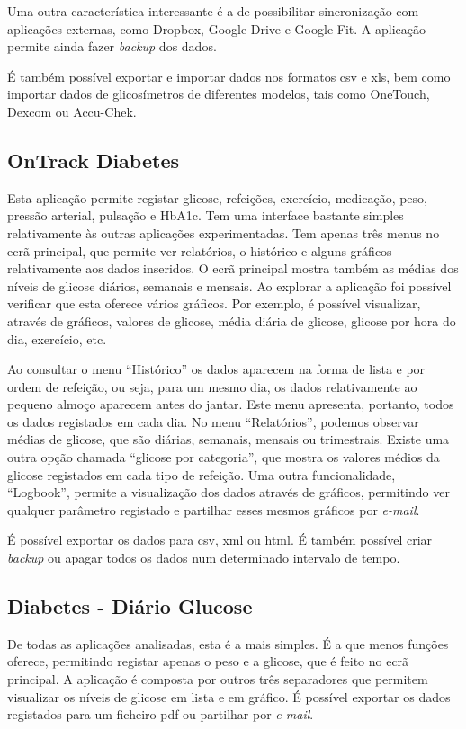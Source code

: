 Uma outra característica interessante é a de possibilitar sincronização com aplicações externas, como Dropbox, Google Drive e Google Fit. A aplicação permite ainda fazer \textit{backup} dos dados.

É também possível exportar e importar dados nos formatos csv e xls, bem como importar dados de glicosímetros de diferentes modelos, tais como OneTouch, Dexcom ou Accu-Chek.

\subsection{OnTrack Diabetes}

Esta aplicação permite registar glicose, refeições, exercício, medicação, peso, pressão arterial, pulsação e HbA1c. Tem uma interface bastante simples relativamente às outras aplicações experimentadas. Tem apenas três menus no ecrã principal, que permite ver relatórios, o histórico e alguns gráficos relativamente aos dados inseridos. O ecrã principal mostra também as médias dos níveis de glicose diários, semanais e mensais. Ao explorar a aplicação foi possível verificar que esta oferece vários gráficos. Por exemplo, é possível visualizar, através de gráficos, valores de glicose, média diária de glicose, glicose por hora do dia, exercício, etc.

Ao consultar o menu ``Histórico'' os dados aparecem na forma de lista e por ordem de refeição, ou seja, para um mesmo dia, os dados relativamente ao pequeno almoço aparecem antes do jantar. Este menu apresenta, portanto, todos os dados registados em cada dia. 
No menu ``Relatórios'', podemos observar médias de glicose, que são diárias, semanais, mensais ou trimestrais. Existe uma outra opção chamada ``glicose por categoria'', que mostra os valores médios da glicose registados em cada tipo de refeição.
Uma outra funcionalidade, ``Logbook'', permite a visualização dos dados através de gráficos, permitindo ver qualquer parâmetro registado e partilhar esses mesmos gráficos por \textit{e-mail}.

É possível exportar os dados para csv, xml ou html. É também possível criar \textit{backup} ou apagar todos os dados num determinado intervalo de tempo.

\subsection{Diabetes - Diário Glucose}

De todas as aplicações analisadas, esta é a mais simples. É a que menos funções oferece, permitindo registar apenas o peso e a glicose, que é feito no ecrã principal. A aplicação é composta por outros três separadores que permitem visualizar os níveis de glicose em lista e em gráfico. É possível exportar os dados registados para um ficheiro pdf ou partilhar por \textit{e-mail}.

